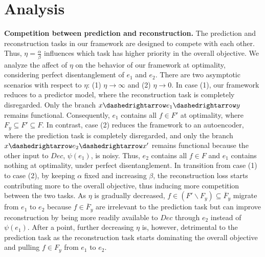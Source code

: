 \section{Analysis}
\label{sec:theoretical}



\textbf{Competition between prediction and reconstruction. \quad} The prediction and reconstruction tasks in our framework are designed to compete with each other. Thus, $\eta = \frac{\alpha}{\beta}$ influences which task has higher priority in the overall objective. We analyze the affect of $\eta$ on the behavior of our framework at optimality, considering perfect disentanglement of $e_1$ and $e_2$. There are two asymptotic scenarios with respect to $\eta$: (1) $\eta \rightarrow \infty$ and (2) $\eta \rightarrow 0$. In case (1), our framework reduces to a predictor model, where the reconstruction task is completely disregarded. Only the branch $x \dashedrightarrow e_1 \dashedrightarrow y$ remains functional. Consequently, $e_1$ contains all $f \in F'$ at optimality, where $F_y \subseteq F' \subseteq F$. In contrast, case (2) reduces the framework to an autoencoder, where the prediction task is completely disregarded, and only the branch $x \dashedrightarrow e_2 \dashedrightarrow x'$ remains functional because the other input to $Dec$, $\psi(e_1)$, is noisy. Thus, $e_2$ contains all $f \in F$ and $e_1$ contains nothing at optimality, under perfect disentanglement. In transition from case (1) to case (2), by keeping $\alpha$ fixed and increasing $\beta$, the reconstruction loss starts contributing more to the overall objective, thus inducing more competition between the two tasks. As $\eta$ is gradually decreased, $f \in (F' \smallsetminus F_y) \subseteq \overline{F}_y$ migrate from $e_1$ to $e_2$ because $f \in \overline{F}_y$ are irrelevant to the prediction task but can improve reconstruction by being more readily available to $Dec$ through $e_2$ instead of $\psi(e_1)$. After a point, further decreasing $\eta$ is, however, detrimental to the prediction task as the reconstruction task starts dominating the overall objective and pulling $f \in F_y$ from $e_1$ to $e_2$.

